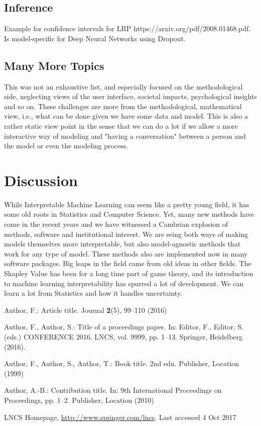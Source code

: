 \documentclass[runningheads]{llncs}
\begin{document}
\subsection{Inference}
Example for confidence intervals for LRP https://arxiv.org/pdf/2008.01468.pdf.
Is model-specific for Deep Neural Networks using Dropout.

\subsection{Many More Topics}
This was not an exhaustive list, and especially focused on the methodological side, neglecting views of the user interface, societal impacts, psychological insights and so on.
These challenges are more from the methodological, mathematical view, i.e., what can be done given we have some data and model.
This is also a rather static view point in the sense that we can do a lot if we allow a more interactive way of modeling and "having a conversation" between a person and the model or even the modeling process.

\section{Discussion}

While Interpretable Machine Learning can seem like a pretty young field, it has some old roots in Statistics and Computer Science.
Yet, many new methods have come in the recent years and we have witnessed a Cambrian explosion of methods, software and institutional interest.
We are seing both ways of making models themselves more interpretable, but also model-agnostic methods that work for any type of model.
These methods also are implemented now in many software packages.
Big leaps in the field came from old ideas in other fields.
The Shapley Value has been for a long time part of game theory, and its introduction to machine learning interpretability has spurred a lot of development.
We can learn a lot from Statistics and how it handles uncertainty.





%
%
%
% 
% 
%
\begin{thebibliography}{8}
Author, F.: Article title. Journal \textbf{2}(5), 99--110 (2016)

Author, F., Author, S.: Title of a proceedings paper. In: Editor,
F., Editor, S. (eds.) CONFERENCE 2016, LNCS, vol. 9999, pp. 1--13.
Springer, Heidelberg (2016). 

Author, F., Author, S., Author, T.: Book title. 2nd edn. Publisher,
Location (1999)

Author, A.-B.: Contribution title. In: 9th International Proceedings
on Proceedings, pp. 1--2. Publisher, Location (2010)

LNCS Homepage, \url{http://www.springer.com/lncs}. Last accessed 4
Oct 2017
\end{thebibliography}
\end{document}

